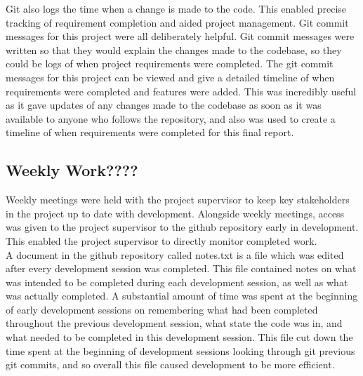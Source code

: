 \documentclass{article}
\begin{document}
Git also logs the time when a change is made to the code. This enabled precise tracking of requirement completion and aided project management. Git commit messages for this project were all deliberately helpful. Git commit messages were written so that they would explain the changes made to the codebase, so they could be logs of when project requirements were completed. The git commit messages for this project can be viewed and give a detailed timeline of when requirements were completed and features were added. This was incredibly useful as it gave updates of any changes made to the codebase as soon as it was available to anyone who follows the repository, and also was used to create a timeline of when requirements were completed for this final report. \\

\subsection{Weekly Work????}

Weekly meetings were held with the project supervisor to keep key stakeholders in the project up to date with development. Alongside weekly meetings, access was given to the project supervisor to the  github repository early in development. This enabled the project supervisor to directly monitor completed work. \\

A document in the github repository called notes.txt is a file which was edited after every development session was completed. This file contained notes on what was intended to be completed during each development session, as well as what was actually completed. A substantial amount of time was spent at the beginning of early development sessions on remembering what had been completed throughout the previous development session, what state the code was in, and what needed to be completed in this development session. This file cut down the time spent at the beginning of development sessions looking through git previous git commits, and so overall this file caused development to be more efficient. \\

\end{document}
